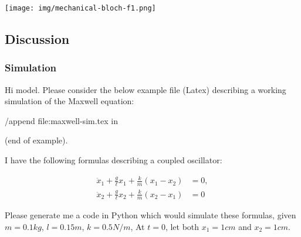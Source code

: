 \begin{result}
\end{result}

\begin{center}
\texttt{[image: img/mechanical-bloch-f1.png]}
\end{center}

\subsection{Discussion}

\subsubsection{Simulation}
\begin{ai}

Hi model. Please consider the below example file (Latex) describing a working simulation of the
Maxwell equation:

/append file:maxwell-sim.tex in

(end of example).

I have the following formulas describing a coupled oscillator:

\[
\begin{aligned}
  \ddot{x}_1 + \frac{g}{\ell} x_1 + \frac{k}{m} (x_1 - x_2) &= 0, \\
  \ddot{x}_2 + \frac{g}{\ell} x_2 + \frac{k}{m} (x_2 - x_1) &= 0
\end{aligned}
\]

Please generate me a code in Python which would simulate these formulas, given $m=0.1 kg$, $l=0.15
m$, $k = 0.5 N/m$, At $t=0$, let both $x_1 = 1 cm$ and $x_2 = 1 cm$.

\end{ai}

